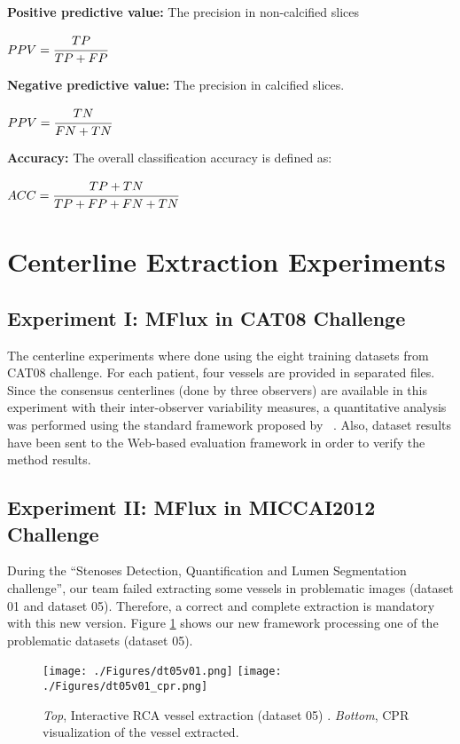 \textbf{Positive predictive value:} The precision in non-calcified slices 
\begin{center}
$PPV= \cfrac{TP}{TP+FP}$
\end{center}

\textbf{Negative predictive value:} The precision in calcified slices.
\begin{center}
$PPV= \cfrac{TN}{FN+TN}$
\end{center}

\textbf{Accuracy:} The overall classification accuracy is defined as:
\begin{center}
$ACC= \cfrac{TP+TN}{TP+FP+FN+TN}$
\end{center}

\section{Centerline Extraction Experiments}

\subsection{Experiment I: MFlux in CAT08 Challenge}

The centerline experiments where done using the eight training datasets from CAT08 challenge. For each patient, four vessels are provided in separated files. Since the consensus centerlines (done by three observers) are available in this experiment with their inter-observer variability measures, a quantitative analysis was performed using the standard framework proposed by ~\citep{Schaap2009}. Also, dataset results have been sent to the Web-based evaluation framework in order to verify the method results.

\subsection{Experiment II: MFlux in MICCAI2012 Challenge}

During the ``Stenoses Detection, Quantification and Lumen Segmentation challenge'', our team failed extracting some  vessels in problematic images (dataset 01 and dataset 05). Therefore, a correct and complete extraction is mandatory with this new version. Figure \ref{fig:exp2_dt05} shows our new framework processing one of the problematic datasets (dataset 05).

\begin{figure}[htbp]
	\centering
		\texttt{[image: ./Figures/dt05v01.png]}
		\texttt{[image: ./Figures/dt05v01\_cpr.png]}
	\caption[MICCAI2012 Extraction]{\textit{Top}, Interactive RCA vessel extraction (dataset 05) . \textit{Bottom}, CPR visualization of the vessel extracted.}
	\label{fig:exp2_dt05}
\end{figure}

